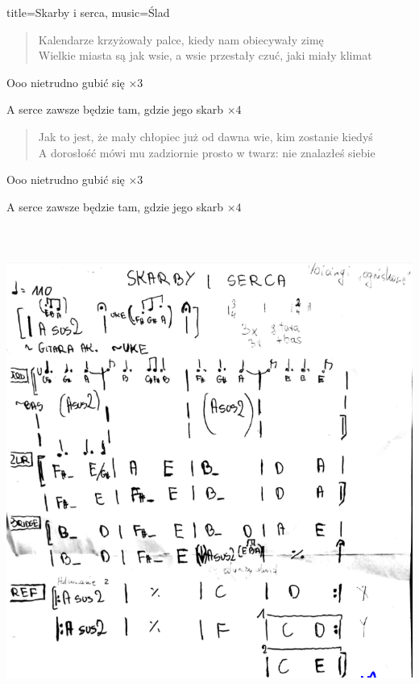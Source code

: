 \newpage
\begin{song}{title={Skarby i serca}, music={Ślad}}
    \begin{verse}
        Kalendarze krzyżowały palce, kiedy nam obiecywały zimę \\
        Wielkie miasta są jak wsie, a wsie przestały czuć, jaki miały klimat 
    \end{verse}
    \begin{interlude}
        Ooo nietrudno gubić się $\times 3$
    \end{interlude}
    \begin{chorus}
        A serce zawsze będzie tam, gdzie jego skarb $\times 4$
    \end{chorus}
    \begin{verse}
        Jak to jest, że mały chłopiec już od dawna wie, kim zostanie kiedyś \\
        A dorosłość mówi mu zadziornie prosto w twarz: nie znalazłeś siebie 
    \end{verse}
    \begin{interlude}
        Ooo nietrudno gubić się $\times 3$
    \end{interlude}
    \begin{chorus}
        A serce zawsze będzie tam, gdzie jego skarb $\times 4$
    \end{chorus}
    \begin{center}
        \vspace{0.6cm}
        \includegraphics[height=16cm]{images/skarby.png}
    \end{center}
\end{song}
